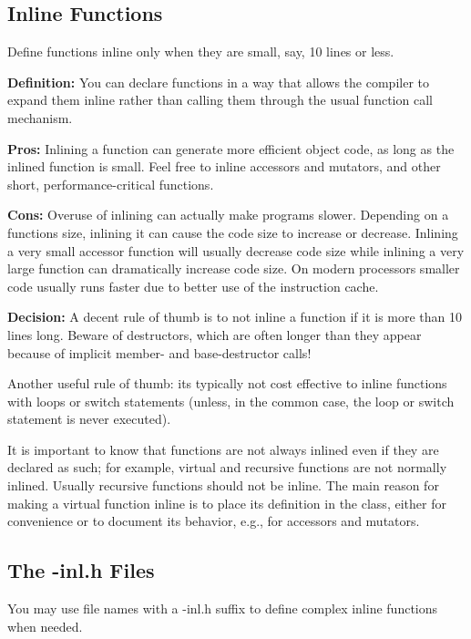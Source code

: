 \subsection*{Inline Functions}

Define functions inline only when they are small, say, 10 lines or less.

{\bfseries Definition\+:} You can declare functions in a way that allows the compiler to expand them inline rather than calling them through the usual function call mechanism.

{\bfseries Pros\+:} Inlining a function can generate more efficient object code, as long as the inlined function is small. Feel free to inline accessors and mutators, and other short, performance-\/critical functions.

{\bfseries Cons\+:} Overuse of inlining can actually make programs slower. Depending on a function\textquotesingle{}s size, inlining it can cause the code size to increase or decrease. Inlining a very small accessor function will usually decrease code size while inlining a very large function can dramatically increase code size. On modern processors smaller code usually runs faster due to better use of the instruction cache.

{\bfseries Decision\+:} A decent rule of thumb is to not inline a function if it is more than 10 lines long. Beware of destructors, which are often longer than they appear because of implicit member-\/ and base-\/destructor calls!

Another useful rule of thumb\+: it\textquotesingle{}s typically not cost effective to inline functions with loops or switch statements (unless, in the common case, the loop or switch statement is never executed).

It is important to know that functions are not always inlined even if they are declared as such; for example, virtual and recursive functions are not normally inlined. Usually recursive functions should not be inline. The main reason for making a virtual function inline is to place its definition in the class, either for convenience or to document its behavior, e.\+g., for accessors and mutators.

\subsection*{The -\/inl.\+h Files}

You may use file names with a -\/inl.\+h suffix to define complex inline functions when needed.


